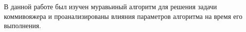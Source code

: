 \Conclusion %
В данной работе был изучен муравьиный алгоритм для решения задачи коммивояжера и проанализированы влияния параметров алгоритма на время его выполнения.
